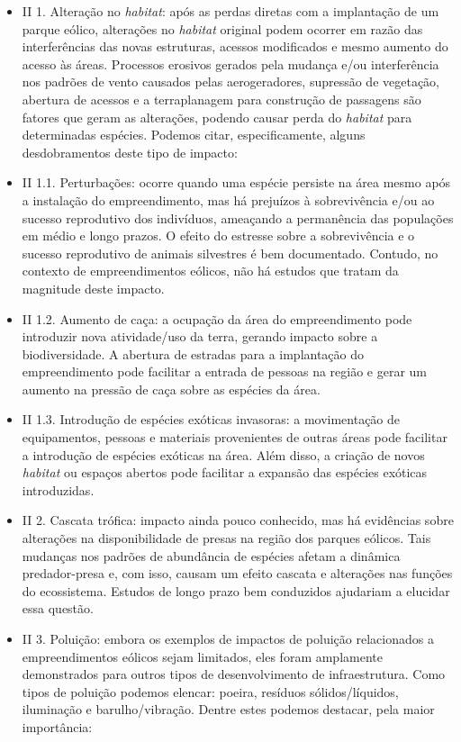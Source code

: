 \documentclass[
  oneside]{scrbook}
\providecommand{\tightlist}{%
  \setlength{\itemsep}{0pt}\setlength{\parskip}{0pt}}
\begin{document}
\begin{itemize}
\tightlist
\item
  II 1. Alteração no \emph{habitat}: após as perdas diretas com a implantação de um parque eólico, alterações no \emph{habitat} original podem ocorrer em razão das interferências das novas estruturas, acessos modificados e mesmo aumento do acesso às áreas. Processos erosivos gerados pela mudança e/ou interferência nos padrões de vento causados pelas aerogeradores, supressão de vegetação, abertura de acessos e a terraplanagem para construção de passagens são fatores que geram as alterações, podendo causar perda do \emph{habitat} para determinadas espécies. Podemos citar, especificamente, alguns desdobramentos deste tipo de impacto:
\item
  II 1.1. Perturbações: ocorre quando uma espécie persiste na área mesmo após a instalação do empreendimento, mas há prejuízos à sobrevivência e/ou ao sucesso reprodutivo dos indivíduos, ameaçando a permanência das populações em médio e longo prazos. O efeito do estresse sobre a sobrevivência e o sucesso reprodutivo de animais silvestres é bem documentado. Contudo, no contexto de empreendimentos eólicos, não há estudos que tratam da magnitude deste impacto.
\item
  II 1.2. Aumento de caça: a ocupação da área do empreendimento pode introduzir nova atividade/uso da terra, gerando impacto sobre a biodiversidade. A abertura de estradas para a implantação do empreendimento pode facilitar a entrada de pessoas na região e gerar um aumento na pressão de caça sobre as espécies da área.
\item
  II 1.3. Introdução de espécies exóticas invasoras: a movimentação de equipamentos, pessoas e materiais provenientes de outras áreas pode facilitar a introdução de espécies exóticas na área. Além disso, a criação de novos \emph{habitat} ou espaços abertos pode facilitar a expansão das espécies exóticas introduzidas.
\item
  II 2. Cascata trófica: impacto ainda pouco conhecido, mas há evidências sobre alterações na disponibilidade de presas na região dos parques eólicos. Tais mudanças nos padrões de abundância de espécies afetam a dinâmica predador-presa e, com isso, causam um efeito cascata e alterações nas funções do ecossistema. Estudos de longo prazo bem conduzidos ajudariam a elucidar essa questão.
\item
  II 3. Poluição: embora os exemplos de impactos de poluição relacionados a empreendimentos eólicos sejam limitados, eles foram amplamente demonstrados para outros tipos de desenvolvimento de infraestrutura. Como tipos de poluição podemos elencar: poeira, resíduos sólidos/líquidos, iluminação e barulho/vibração. Dentre estes podemos destacar, pela maior importância:

\end{itemize}
\end{document}
